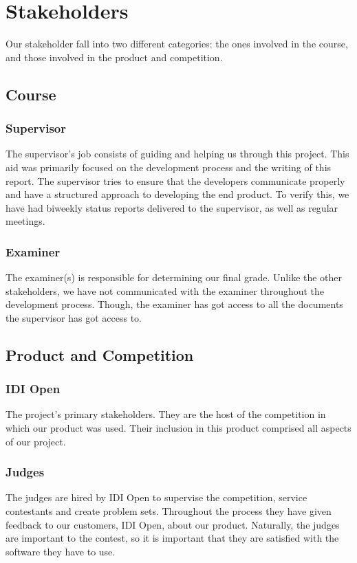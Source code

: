 \section{Stakeholders}
Our stakeholder fall into two different categories: the ones involved in the
course, and those involved in the product and competition.

\subsection{Course}
\subsubsection{Supervisor}
The supervisor's job consists of guiding and helping us
through this project. This aid was primarily focused on the development
process and the writing of this report. The supervisor tries to ensure
that the developers communicate properly and have a structured approach
to developing the end product. To verify this, we have had biweekly
status reports delivered to the supervisor, as well as regular
meetings.

\subsubsection{Examiner}
The examiner(s) is responsible for determining our final grade. Unlike
the other stakeholders, we have not communicated with the examiner
throughout the development process. Though, the examiner has got access
to all the documents the supervisor has got access to.

\subsection{Product and Competition}
\subsubsection{IDI Open}
The project's primary stakeholders. They are the host of
the competition in which our product was used. Their inclusion in this
product comprised all aspects of our project.

\subsubsection{Judges}
The judges are hired by IDI Open to supervise the competition, service
contestants and create problem sets. Throughout the process they have given
feedback to our customers, IDI Open, about our product. Naturally, the
judges are important to the contest, so it is important that they are
satisfied with the software they have to use.


